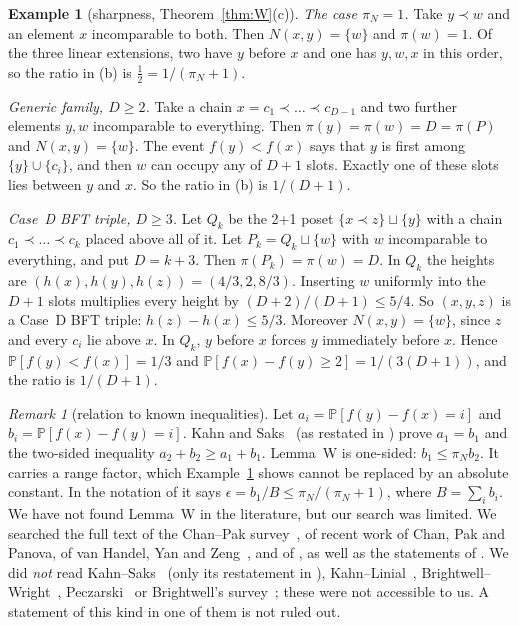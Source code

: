 \documentclass[10pt]{amsart}
\theoremstyle{definition}
\newtheorem{example}[theorem]{Example}
\theoremstyle{remark}
\newtheorem{remark}[theorem]{Remark}
\newcommand{\PP}{\mathbb{P}}
\begin{document}
\begin{example}[sharpness, Theorem~\ref{thm:W}(c)]\label{ex:sharp}
\emph{The case $\pi_N=1$.} Take $y\prec w$ and an element $x$ incomparable to both. Then $N(x,y)=\{w\}$ and $\pi(w)=1$. Of the three linear extensions, two have $y$ before $x$ and one has $y,w,x$ in this order, so the ratio in (b) is $\frac12=1/(\pi_N+1)$.

\emph{Generic family, $D\ge2$.} Take a chain $x=c_1\prec\dots\prec c_{D-1}$ and two further elements $y,w$ incomparable to everything.
Then $\pi(y)=\pi(w)=D=\pi(P)$ and $N(x,y)=\{w\}$.
The event $f(y)<f(x)$ says that $y$ is first among $\{y\}\cup\{c_i\}$, and then $w$ can occupy any of $D+1$ slots. Exactly one of these slots lies between $y$ and $x$. So the ratio in (b) is $1/(D+1)$.

\emph{Case~D BFT triple, $D\ge3$.} Let $Q_k$ be the 2+1 poset $\{x\prec z\}\sqcup\{y\}$ with a chain $c_1\prec\dots\prec c_k$ placed above all of it.
Let $P_k=Q_k\sqcup\{w\}$ with $w$ incomparable to everything, and put $D=k+3$.
Then $\pi(P_k)=\pi(w)=D$.
In $Q_k$ the heights are $(h(x),h(y),h(z))=(4/3,2,8/3)$.
Inserting $w$ uniformly into the $D+1$ slots multiplies every height by $(D+2)/(D+1)\le 5/4$.
So $(x,y,z)$ is a Case~D BFT triple: $h(z)-h(x)\le 5/3$.
Moreover $N(x,y)=\{w\}$, since $z$ and every $c_i$ lie above $x$.
In $Q_k$, $y$ before $x$ forces $y$ immediately before $x$. Hence $\PP[f(y)<f(x)]=1/3$ and $\PP[f(x)-f(y)\ge2]=1/(3(D+1))$, and the ratio is $1/(D+1)$.
\end{example}

\begin{remark}[relation to known inequalities]
Let $a_i=\PP[f(y)-f(x)=i]$ and $b_i=\PP[f(x)-f(y)=i]$. Kahn and Saks~\cite{KS84} (as restated in \cite[Lemma~2.1]{BFT95}) prove $a_1=b_1$ and the two-sided inequality $a_2+b_2\ge a_1+b_1$.
Lemma~W is one-sided: $b_1\le\pi_N b_2$. It carries a range factor, which Example~\ref{ex:sharp} shows cannot be replaced by an absolute constant.
In the notation of \cite{BFT95} it says $\epsilon=b_1/B\le\pi_N/(\pi_N+1)$, where $B=\sum_i b_i$.
We have not found Lemma~W in the literature, but our search was limited.
We searched the full text of the Chan--Pak survey~\cite{CP23}, of recent work of Chan, Pak and Panova, of van Handel, Yan and Zeng~\cite{vHYZ23}, and of \cite{AK25a,AK25b,Haq26}, as well as the statements of \cite{BFT95}.
We did \emph{not} read Kahn--Saks~\cite{KS84} (only its restatement in \cite{BFT95}), Kahn--Linial~\cite{KL91}, Brightwell--Wright~\cite{BW92}, Peczarski~\cite{Pec08} or Brightwell's survey~\cite{Bri99}; these were not accessible to us.
A statement of this kind in one of them is not ruled out.
\end{remark}
\end{document}
